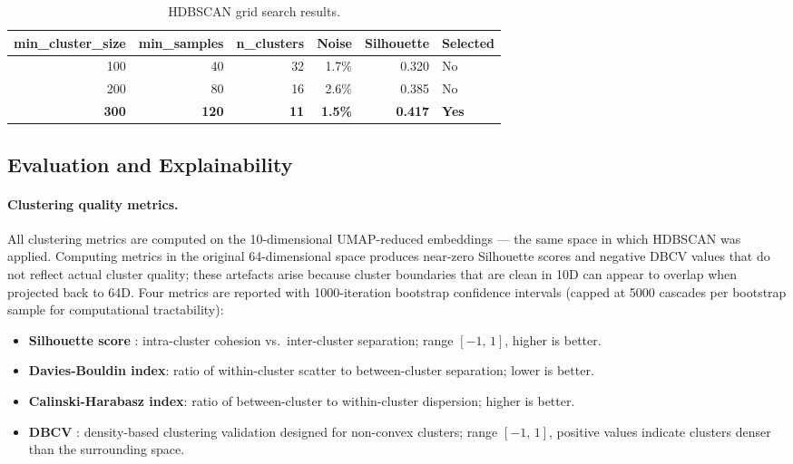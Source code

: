 \documentclass[12pt, a4paper]{article}
\begin{document}
\begin{table}[H]
\centering
\caption{HDBSCAN grid search results.}
\label{tab:gridsearch}
\begin{tabular}{@{}rrrrrl@{}}
\toprule
\textbf{min\_cluster\_size} & \textbf{min\_samples} & \textbf{n\_clusters} & \textbf{Noise} & \textbf{Silhouette} & \textbf{Selected} \\
\midrule
100 & 40  & 32 & 1.7\% & 0.320 & No  \\
200 & 80  & 16 & 2.6\% & 0.385 & No  \\
\textbf{300} & \textbf{120} & \textbf{11} & \textbf{1.5\%} & \textbf{0.417} & \textbf{Yes} \\
\bottomrule
\end{tabular}
\end{table}

\subsection{Evaluation and Explainability}

\paragraph{Clustering quality metrics.} All clustering metrics are computed on the 10-dimensional UMAP-reduced embeddings --- the same space in which HDBSCAN was applied. Computing metrics in the original 64-dimensional space produces near-zero Silhouette scores and negative DBCV values that do not reflect actual cluster quality; these artefacts arise because cluster boundaries that are clean in 10D can appear to overlap when projected back to 64D. Four metrics are reported with 1000-iteration bootstrap confidence intervals (capped at 5000 cascades per bootstrap sample for computational tractability):
\begin{itemize}
  \item \textbf{Silhouette score} \citep{rousseeuw1987silhouettes}: intra-cluster cohesion vs.\ inter-cluster separation; range $[-1,\,1]$, higher is better.
  \item \textbf{Davies-Bouldin index}: ratio of within-cluster scatter to between-cluster separation; lower is better.
  \item \textbf{Calinski-Harabasz index}: ratio of between-cluster to within-cluster dispersion; higher is better.
  \item \textbf{DBCV} \citep{moulavi2014dbcv}: density-based clustering validation designed for non-convex clusters; range $[-1,\,1]$, positive values indicate clusters denser than the surrounding space.
\end{itemize}
\end{document}
